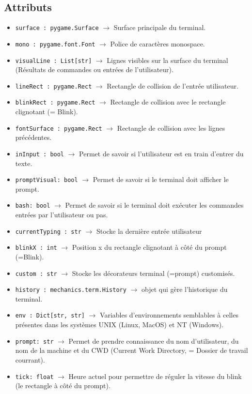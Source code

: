 \documentclass{report}
\begin{document}
\subsection*{Attributs}
\begin{itemize}
  \item \texttt{surface : pygame.Surface}		$\rightarrow$ Surface principale du terminal.
  \item \texttt{mono : pygame.font.Font}		$\rightarrow$ Police de caractères monospace.
  \item \texttt{visualLine : List[str]}		$\rightarrow$ Lignes visibles sur la surface du terminal (Résultats de commandes ou entrées de l'utilisateur).
  \item \texttt{lineRect : pygame.Rect}		$\rightarrow$ Rectangle de collision de l’entrée utilisateur.
  \item \texttt{blinkRect : pygame.Rect}		$\rightarrow$ Rectangle de collision avec le rectangle clignotant (= Blink).
  \item \texttt{fontSurface : pygame.Rect}		$\rightarrow$ Rectangle de collision avec les lignes précédentes.
  \item \texttt{inInput : bool}			$\rightarrow$ Permet de savoir si l’utilisateur est en train d'entrer du texte.
  \item \texttt{promptVisual: bool}			$\rightarrow$ Permet de savoir si le terminal doit afficher le prompt.
  \item \texttt{bash: bool}				$\rightarrow$ Permet de savoir si le terminal doit exécuter les commandes entrées par l'utilisateur ou pas.
  \item \texttt{currentTyping : str}		$\rightarrow$ Stocke la dernière entrée utilisateur
  \item \texttt{blinkX : int}			$\rightarrow$ Position x du rectangle clignotant à côté du prompt (=Blink).
  \item \texttt{custom : str}			$\rightarrow$ Stocke les décorateurs terminal (=prompt) customisés.
  \item \texttt{history : mechanics.term.History}	$\rightarrow$ objet qui gère l'historique du terminal.
  \item \texttt{env : Dict[str, str]}		$\rightarrow$ Variables d'environnements semblables à celles présentes dans les systèmes UNIX (Linux, MacOS) et NT (Windows).
  \item \texttt{prompt: str}		$\rightarrow$ Permet de prendre connaissance du nom d’utilisateur, du nom de la machine et du CWD (Current Work Directory, = Dossier de travail courrant).
  \item \texttt{tick: float}		$\rightarrow$ Heure actuel pour permettre de réguler la vitesse du blink (le rectangle à côté du prompt).
\end{itemize}
\end{document}
